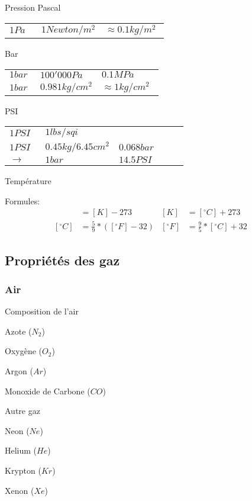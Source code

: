 \documentclass[aspectratio=1610,english,12pt]{beamer}
\begin{document}
\begin{frame}{Pression}
	Pascal\\
	\begin{tabular}{p{0.2\linewidth} p{0.4\linewidth} l}
		$1 Pa$ & $1 Newton/m^2$ & $\approx0.1kg/m^2$
	\end{tabular}
	Bar\\
	\begin{tabular}{p{0.2\linewidth} p{0.4\linewidth} l}
		$1 bar$ & $100'000Pa$ & $0.1MPa$\\
		$1 bar$ & $0.981kg/cm^2$ & $\approx1kg/cm^2$
	\end{tabular}
	PSI\\
	\begin{tabular}{p{0.2\linewidth} p{0.4\linewidth} l}
		$1 PSI$ & $1lbs/sqi$&\\
		$1 PSI$ & $0.45kg/6.45cm^2$ & $0.068bar$\\
		$\rightarrow$ & $1bar$ & $14.5PSI$
	\end{tabular}
\end{frame}

\begin{frame}{Température}
		 \par
	Formules:
		\begin{align*}
			[^{\circ}C] &= [K]-273 & [K] &= [^{\circ}C]+273\\
			[^{\circ}C] &= \frac{5}{9}*([^{\circ}F]-32) & [^{\circ}F] &= \frac{9}{5}*[^{\circ}C]+32 &
		\end{align*}
\end{frame}

\subsection{Propriétés des gaz}

\subsubsection{Air}
\begin{frame}{Composition de l'air}
	\begin{description}[lalign=parleft]
		\item[$78.084\%$]Azote ($N_2$)
		\item[$20.946\%$]Oxygène ($O_2$)
		\item[$0.934\%$]Argon ($Ar$)
		\item[$0.033\%$]Monoxide de Carbone ($CO$)
		\item[$0.003\%$]Autre gaz
		\item[]
		\item[$18.18ppm$]Neon ($Ne$)
		\item[$5.24ppm$]Helium ($He$)
		\item[$1.14ppm$]Krypton ($Kr$)
		\item[$0.09ppm$]Xenon ($Xe$)
	\end{description}
\end{frame}
\end{document}
